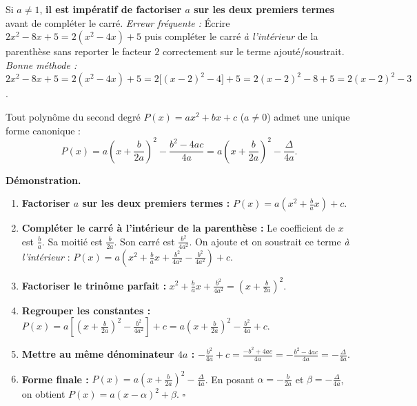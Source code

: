 \documentclass[11pt]{article}
\providecommand{\qed}{\hfill$\square$}
\begin{document}
\begin{attention}
Si $a \neq 1$, \textbf{il est impératif de factoriser $a$ sur les deux premiers termes} avant de compléter le carré.
\emph{Erreur fréquente :} Écrire $2x^2 - 8x + 5 = 2(x^2 - 4x) + 5$ puis compléter le carré \emph{à l'intérieur} de la parenthèse sans reporter le facteur $2$ correctement sur le terme ajouté/soustrait.
\emph{Bonne méthode :} $2x^2 - 8x + 5 = 2(x^2 - 4x) + 5 = 2\bigl[(x-2)^2 - 4\bigr] + 5 = 2(x-2)^2 - 8 + 5 = 2(x-2)^2 - 3$.
\end{attention}

\begin{propriete}
Tout polynôme du second degré $P(x) = ax^2 + bx + c$ ($a \neq 0$) admet une unique forme canonique :
\[
P(x) = a\left(x + \frac{b}{2a}\right)^2 - \frac{b^2 - 4ac}{4a} = a\left(x + \frac{b}{2a}\right)^2 - \frac{\Delta}{4a}.
\]

\textbf{Démonstration.}
\begin{enumerate}
\item \textbf{Factoriser $a$ sur les deux premiers termes :}
$P(x) = a\left(x^2 + \frac{b}{a}x\right) + c$.
\item \textbf{Compléter le carré à l'intérieur de la parenthèse :}
Le coefficient de $x$ est $\frac{b}{a}$. Sa moitié est $\frac{b}{2a}$. Son carré est $\frac{b^2}{4a^2}$.
On ajoute et on soustrait ce terme \emph{à l'intérieur} :
$P(x) = a\left(x^2 + \frac{b}{a}x + \frac{b^2}{4a^2} - \frac{b^2}{4a^2}\right) + c$.
\item \textbf{Factoriser le trinôme parfait :}
$x^2 + \frac{b}{a}x + \frac{b^2}{4a^2} = \left(x + \frac{b}{2a}\right)^2$.
\item \textbf{Regrouper les constantes :}
$P(x) = a\left[\left(x + \frac{b}{2a}\right)^2 - \frac{b^2}{4a^2}\right] + c
= a\left(x + \frac{b}{2a}\right)^2 - \frac{b^2}{4a} + c$.
\item \textbf{Mettre au même dénominateur $4a$ :}
$-\frac{b^2}{4a} + c = \frac{-b^2 + 4ac}{4a} = -\frac{b^2 - 4ac}{4a} = -\frac{\Delta}{4a}$.
\item \textbf{Forme finale :}
$P(x) = a\left(x + \frac{b}{2a}\right)^2 - \frac{\Delta}{4a}$.
En posant $\alpha = -\frac{b}{2a}$ et $\beta = -\frac{\Delta}{4a}$, on obtient $P(x) = a(x-\alpha)^2 + \beta$. \qed
\end{enumerate}
\end{propriete}
\end{document}
